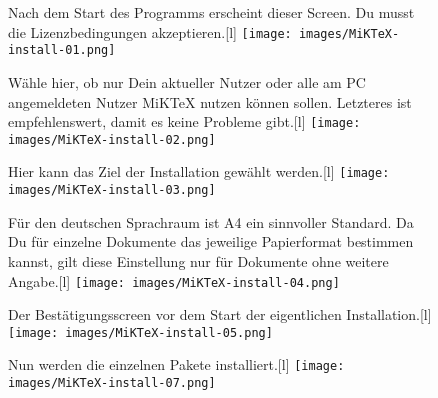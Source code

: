 \begin{figure}[hb]
	\begin{captionbeside}{Nach dem Start des Programms erscheint dieser Screen. Du musst die Lizenzbedingungen akzeptieren.}[l]
		\texttt{[image: images/MiKTeX-install-01.png]}
	\end{captionbeside}
	\label{fig:install01}
\end{figure}

\begin{figure}[hb]
	\begin{captionbeside}{Wähle hier, ob nur Dein aktueller Nutzer oder alle am PC angemeldeten Nutzer MiKTeX nutzen können sollen. Letzteres ist empfehlenswert, damit es keine Probleme gibt.}[l]
		\texttt{[image: images/MiKTeX-install-02.png]}
	\end{captionbeside}
	\label{fig:install02}
\end{figure}

\begin{figure}[hb]
	\begin{captionbeside}{Hier kann das Ziel der Installation gewählt werden.}[l]
		\texttt{[image: images/MiKTeX-install-03.png]}
	\end{captionbeside}
	\label{fig:install03}
\end{figure}

\begin{figure}[hb]
	\begin{captionbeside}{Für den deutschen Sprachraum ist A4 ein sinnvoller Standard. Da Du für einzelne Dokumente das jeweilige Papierformat bestimmen kannst, gilt diese Einstellung nur für Dokumente ohne weitere Angabe.}[l]
		\texttt{[image: images/MiKTeX-install-04.png]}
	\end{captionbeside}
	\label{fig:install04}
\end{figure}

\begin{figure}[th]
	\begin{captionbeside}{Der Bestätigungsscreen vor dem Start der eigentlichen Installation.}[l]
		\texttt{[image: images/MiKTeX-install-05.png]}
	\end{captionbeside}
	\label{fig:install06}
\end{figure}

\begin{figure}[th]
	\begin{captionbeside}{Nun werden die einzelnen Pakete installiert.}[l]
		\texttt{[image: images/MiKTeX-install-07.png]}
	\end{captionbeside}
	\label{fig:install07}
\end{figure}

